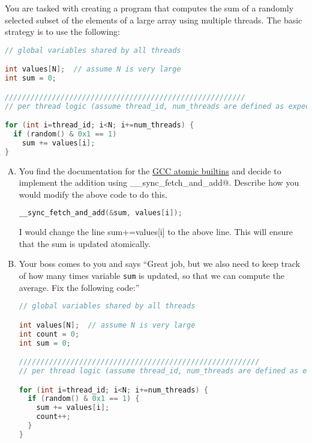 \documentclass[11pt]{article}
\newcommand{\cref}[2]{\href{#1}{\color{blue}#2}}
\newenvironment{choice}{\begin{enumerate}[A.]}{\end{enumerate}}
\newenvironment{answer}{\begin{minipage}[c][1.5in]{\textwidth}}{\end{minipage}}
\begin{document}
You are tasked with creating a program that computes the sum of a
randomly selected subset of the elements of a
large array using multiple threads. The basic strategy is to use the
following:

\begin{lstlisting}[language=C]
// global variables shared by all threads

int values[N];  // assume N is very large
int sum = 0;

////////////////////////////////////////////////////////
// per thread logic (assume thread_id, num_threads are defined as expected)

for (int i=thread_id; i<N; i+=num_threads) {
  if (random() & 0x1 == 1)  
    sum += values[i];
}
\end{lstlisting}

\begin{choice}
\item
You find the documentation for the
\cref{https://gcc.gnu.org/onlinedocs/gcc-4.1.2/gcc/Atomic-Builtins.html}{GCC
atomic builtins} and decide to implement the addition using
\verb@__sync_fetch_and_add@.  Describe how you would modify the above code to do this.

\begin{answer}
\begin{lstlisting}[language=C]
__sync_fetch_and_add(&sum, values[i]);
\end{lstlisting}
I would change the line sum+=values[i] to the above line.
This will ensure that the sum is updated atomically.

\end{answer}

\newpage
\item
Your boss comes to you and says ``Great job, but we also need to keep
track of how many times variable \texttt{sum} is updated, so that we
can compute the average.  Fix the
following code:''  

\begin{lstlisting}[language=C]
// global variables shared by all threads

int values[N];  // assume N is very large
int count = 0;
int sum = 0;

////////////////////////////////////////////////////////
// per thread logic (assume thread_id, num_threads are defined as expected)

for (int i=thread_id; i<N; i+=num_threads) {
  if (random() & 0x1 == 1) {
    sum += values[i];
    count++;
  }
}
\end{lstlisting}


\end{choice}
\end{document}
